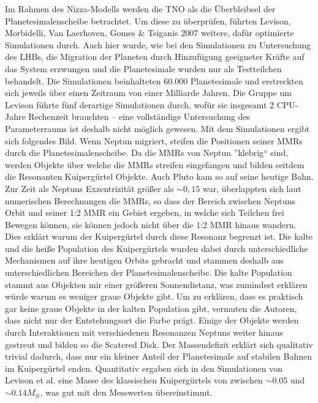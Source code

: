 \documentclass[10pt,a4paper,twoside]{article}
\begin{document}
Im Rahmen des Nizza-Modells werden die TNO als die Überbleibsel der Planetesimalenscheibe betrachtet.
Um diese zu überprüfen, führten Levison, Morbidelli, Van Laerhoven, Gomes \& Tsiganis 2007 weitere, dafür optimierte Simulationen durch. Auch hier wurde, wie bei den Simulationen zu Untersuchung des LHBs, die Migration der Planeten durch Hinzufügung geeigneter Kräfte auf das System erzwungen und die Planetesimale wurden nur als Testteilchen behandelt\cite{Levison2008}. %
Die Simulationen beinhalteten 60.000 Planetesimale und erstreckten sich jeweils über einen Zeitraum von einer Milliarde Jahren\cite{Levison2008}. Die Gruppe um Levison führte fünf derartige Simulationen durch, wofür sie insgesamt 2 CPU-Jahre Rechenzeit brauchten – eine vollständige Untersuchung des Parameterraums ist deshalb nicht möglich gewesen\cite{Levison2008}.
Mit dem Simulationen ergibt sich folgendes Bild. %
Wenn Neptun migriert, steifen die Positionen seiner MMRs durch die Planetesimalenscheibe. Da die MMRs von Neptun ''klebrig`` sind\cite{Levison2008}, werden Objekte über welche die MMRs streifen eingefangen und bilden seitdem die Resonanten Kuipergürtel Objekte. Auch Pluto kam so auf seine heutige Bahn.
Zur Zeit als Neptuns Exzentrizität größer als $\sim 0,15$ war, überlappten sich laut numerischen Berechnungen die MMRs, so dass der Bereich zwischen Neptuns Orbit und seiner 1:2 MMR ein Gebiet ergeben, in welche sich Teilchen frei Bewegen können, sie können jedoch nicht über die 1:2 MMR hinaus wandern\cite{Levison2008}. Dies erklärt warum der Kuipergürtel durch diese Resonanz begrenzt ist.
Die kalte und die heiße Population des Kuipergürtels wurden dabei durch unterschiedliche Mechanismen auf ihre heutigen Orbits gebracht und stammen deshalb aus unterschiedlichen Bereichen der Planetesimalenscheibe. Die kalte Population stammt aus Objekten mir einer größeren Sonnendistanz, was zumindest erklären würde warum es weniger graue Objekte gibt. Um zu erklären, dass es praktisch gar keine graue Objekte in der kalten Population gibt, vermuten die Autoren, dass nicht nur der Entstehungsort die Farbe prägt\cite{Levison2008}. %
Einige der Objekte werden durch Interaktionen mit verschiedenen Resonanzen Neptuns weiter hinaus gestreut und bilden so die Scatered Disk. %
Der Massendefizit erklärt sich qualitativ trivial dadurch, dass nur ein kleiner Anteil der Planetesimale auf stabilen Bahnen im Kuipergürtel enden. Quantitativ ergaben sich in den Simulationen von Levison et al. eine Masse des klassischen Kuipergürtels von zwischen $\sim0.05$ und $\sim0.14 M_\oplus$, was gut mit den Messwerten übereinstimmt\cite{Levison2008}.
\end{document}
